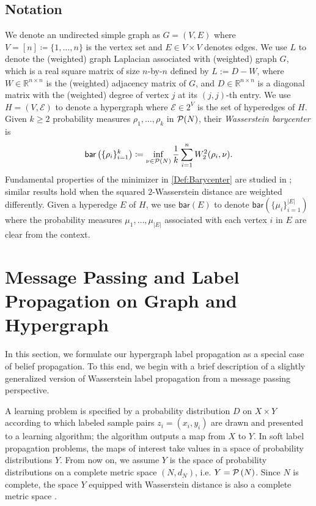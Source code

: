 \documentclass[letterpaper]{article} %
\begin{document}
\subsection{Notation}
We denote an undirected simple graph as $G=(V, E)$ where $V=[n]\coloneqq\{1, \dots, n\}$ is the vertex set and $E\in V\times V$ denotes edges. We use $L$ to denote the (weighted) graph Laplacian associated with (weighted) graph $G$, which is a real square matrix of size $n$-by-$n$ defined by $L:=D-W$, where $W\in \mathbb{R}^{n\times n}$ is the (weighted) adjacency matrix of $G$, and $D\in \mathbb{R}^{n\times n}$ is a diagonal matrix with the (weighted) degree of vertex $j$ at its $\left( j,j \right)$-th entry. We use $H=(V, \mathcal E)$ to denote a hypergraph where $\mathcal E\in 2^V$ is the set of hyperedges of $H$. Given $k\geq 2$ probability measures $\rho_1, \dots, \rho_k$ in $\P(N)$, their \textit{Wasserstein barycenter} is %
\begin{equation}\label{Def:Barycenter}
    \mathsf{bar}\left(\{\rho_i\}_{i=1}^k\right)\coloneqq \inf_{\nu\in \P(N)}\frac{1}{k}\sum_{i=1}^nW_2^2(\rho_i, \nu).
\end{equation} 
Fundamental properties of the minimizer in \eqref{Def:Barycenter} are studied in \cite{Wasserstein_Barycenter}; similar results hold when the squared $2$-Wasserstein distance are weighted differently. Given a hyperedge $E$ of $H$, we use $\mathsf{bar}(E)$ to denote $\mathsf{bar}\left(\{\mu_i\}_{i=1}^{|E|}\right)$ where the probability measures $\mu_1, \dots, \mu_{|E|}$ associated with each vertex $i$ in 
$E$ are clear from the context.


\section{Message Passing and Label Propagation on Graph and Hypergraph}
In this section, we formulate our hypergraph label propagation as a special case of belief propagation. To this end, we begin with a brief description of a slightly generalized version of Wasserstein label propagation \cite{Solomon:2014} from a message passing perspective.


A learning problem is specified by a probability distribution $D$ on $X\times Y$  according to which labeled sample pairs $z_i=\left( x_i,y_i \right)$ are drawn and presented to a learning algorithm; the algorithm outputs a map from $X$ to $Y$. In soft label propagation problems, the maps of interest take values in a space of probability distributions $Y$. From now on, we assume $Y$ is the space of probability distributions on a complete metric space $\left( N,d_N \right)$, i.e. $Y=\P\left( N \right)$. Since $N$ is complete, the space $Y$ equipped with Wasserstein distance is also a complete metric space \cite[Theorem 6.18]{villani2003topics}.
\end{document}
